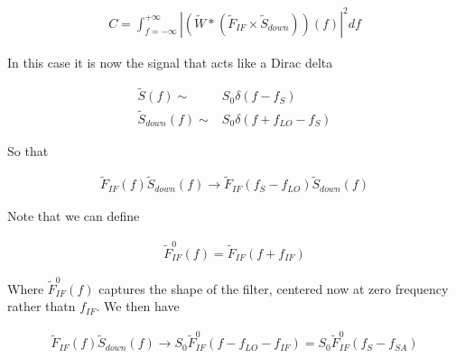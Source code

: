 \documentclass[12pt]{article}
\begin{document}
\begin{align}
C= \int_{f=-\infty}^{+\infty} \left|\left(\tilde{W} \ast \left(\tilde{F}_{IF} \times \tilde{S}_{down}\right)\right)(f)\right|^2 df
\end{align}

In this case it is now the signal that acts like a Dirac delta

\begin{align}
\tilde{S}(f) \sim& S_0 \delta(f-f_S)\\
\tilde{S}_{down}(f) \sim& S_0 \delta(f+f_{LO}-f_S)
\end{align}

So that

\begin{align}
\tilde{F}_{IF}(f)\tilde{S}_{down}(f) \rightarrow \tilde{F}_{IF}(f_S - f_{LO})\tilde{S}_{down}(f)
\end{align}

Note that we can define

\begin{align}
\tilde{F}_{IF}^0(f) = \tilde{F}_{IF}(f+f_{IF})
\end{align}

Where $\tilde{F}_{IF}^0(f)$ captures the shape of the filter, centered now at zero frequency rather thatn $f_{IF}$.
We then have

\begin{align}
\tilde{F}_{IF}(f)\tilde{S}_{down}(f) \rightarrow S_0\tilde{F}_{IF}^0(f - f_{LO} - f_{IF}) = S_0 \tilde{F}_{IF}^0(f_S-f_{SA})
\end{align}
\end{document}
